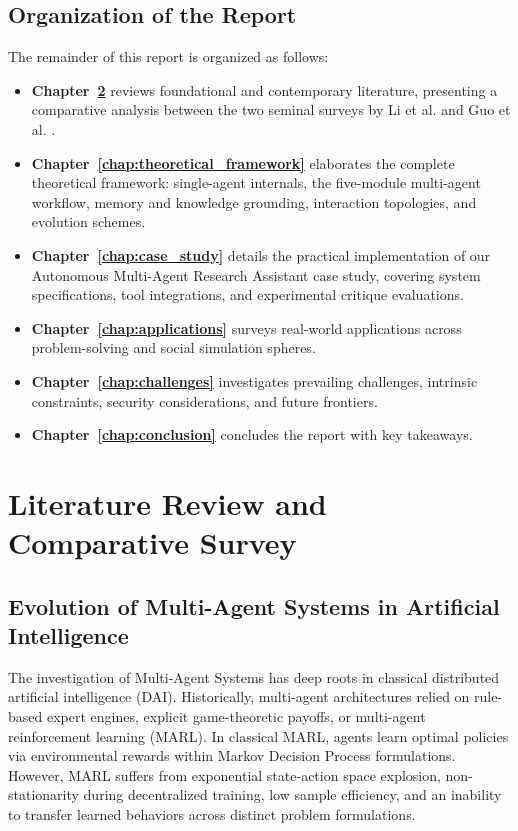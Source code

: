 \documentclass[12pt,a4paper]{report}
\begin{document}
\section{Organization of the Report}
The remainder of this report is organized as follows:
\begin{itemize}
    \item \textbf{Chapter~\ref{chap:literature_review}} reviews foundational and contemporary literature, presenting a comparative analysis between the two seminal surveys by Li et al. \cite{li2024survey} and Guo et al. \cite{guo2024large}.
    \item \textbf{Chapter~\ref{chap:theoretical_framework}} elaborates the complete theoretical framework: single-agent internals, the five-module multi-agent workflow, memory and knowledge grounding, interaction topologies, and evolution schemes.
    \item \textbf{Chapter~\ref{chap:case_study}} details the practical implementation of our Autonomous Multi-Agent Research Assistant case study, covering system specifications, tool integrations, and experimental critique evaluations.
    \item \textbf{Chapter~\ref{chap:applications}} surveys real-world applications across problem-solving and social simulation spheres.
    \item \textbf{Chapter~\ref{chap:challenges}} investigates prevailing challenges, intrinsic constraints, security considerations, and future frontiers.
    \item \textbf{Chapter~\ref{chap:conclusion}} concludes the report with key takeaways.
\end{itemize}


\chapter{Literature Review and Comparative Survey}
\label{chap:literature_review}

\section{Evolution of Multi-Agent Systems in Artificial Intelligence}
The investigation of Multi-Agent Systems has deep roots in classical distributed artificial intelligence (DAI). Historically, multi-agent architectures relied on rule-based expert engines, explicit game-theoretic payoffs, or multi-agent reinforcement learning (MARL). In classical MARL, agents learn optimal policies via environmental rewards within Markov Decision Process formulations. However, MARL suffers from exponential state-action space explosion, non-stationarity during decentralized training, low sample efficiency, and an inability to transfer learned behaviors across distinct problem formulations.
\end{document}
